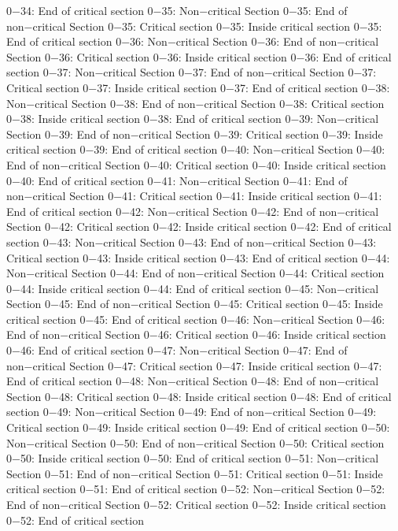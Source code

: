 0−34: End of critical section
0−35: Non−critical Section
0−35: End of non−critical Section
0−35: Critical section
0−35: Inside critical section
0−35: End of critical section
0−36: Non−critical Section
0−36: End of non−critical Section
0−36: Critical section
0−36: Inside critical section
0−36: End of critical section
0−37: Non−critical Section
0−37: End of non−critical Section
0−37: Critical section
0−37: Inside critical section
0−37: End of critical section
0−38: Non−critical Section
0−38: End of non−critical Section
0−38: Critical section
0−38: Inside critical section
0−38: End of critical section
0−39: Non−critical Section
0−39: End of non−critical Section
0−39: Critical section
0−39: Inside critical section
0−39: End of critical section
0−40: Non−critical Section
0−40: End of non−critical Section
0−40: Critical section
0−40: Inside critical section
0−40: End of critical section
0−41: Non−critical Section
0−41: End of non−critical Section
0−41: Critical section
0−41: Inside critical section
0−41: End of critical section
0−42: Non−critical Section
0−42: End of non−critical Section
0−42: Critical section
0−42: Inside critical section
0−42: End of critical section
0−43: Non−critical Section
0−43: End of non−critical Section
0−43: Critical section
0−43: Inside critical section
0−43: End of critical section
0−44: Non−critical Section
0−44: End of non−critical Section
0−44: Critical section
0−44: Inside critical section
0−44: End of critical section
0−45: Non−critical Section
0−45: End of non−critical Section
0−45: Critical section
0−45: Inside critical section
0−45: End of critical section
0−46: Non−critical Section
0−46: End of non−critical Section
0−46: Critical section
0−46: Inside critical section
0−46: End of critical section
0−47: Non−critical Section
0−47: End of non−critical Section
0−47: Critical section
0−47: Inside critical section
0−47: End of critical section
0−48: Non−critical Section
0−48: End of non−critical Section
0−48: Critical section
0−48: Inside critical section
0−48: End of critical section
0−49: Non−critical Section
0−49: End of non−critical Section
0−49: Critical section
0−49: Inside critical section
0−49: End of critical section
0−50: Non−critical Section
0−50: End of non−critical Section
0−50: Critical section
0−50: Inside critical section
0−50: End of critical section
0−51: Non−critical Section
0−51: End of non−critical Section
0−51: Critical section
0−51: Inside critical section
0−51: End of critical section
0−52: Non−critical Section
0−52: End of non−critical Section
0−52: Critical section
0−52: Inside critical section
0−52: End of critical section
